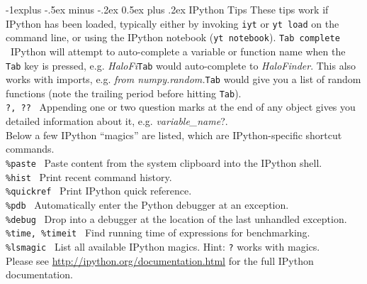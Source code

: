 \documentclass[10pt,landscape]{article}
\makeatletter
\renewcommand{\subsection}{\@startsection{subsection}{2}{0mm}%
                                {-1explus -.5ex minus -.2ex}%
                                {0.5ex plus .2ex}%
                                {\normalfont\normalsize\bfseries}}
\makeatother
\begin{document}
\begin{multicols}{3}
\subsection{IPython Tips}
These tips work if IPython has been loaded, typically either by invoking
\texttt{iyt} or \texttt{yt load} on the command line, or using the IPython notebook (\texttt{yt notebook}).
\texttt{Tab complete} \textemdash\ IPython will attempt to auto-complete a
variable or function name when the \texttt{Tab} key is pressed, e.g. {\it HaloFi}\textendash\texttt{Tab} would auto-complete
to {\it HaloFinder}. This also works with imports, e.g. {\it from numpy.random.}\textendash\texttt{Tab}
would give you a list of random functions (note the trailing period before hitting \texttt{Tab}).\\
\texttt{?, ??} \textemdash\ Appending one or two question marks at the end of any object gives you
detailed information about it, e.g. {\it variable\_name}?.\\
Below a few IPython ``magics'' are listed, which are IPython-specific shortcut commands.\\
\texttt{\%paste} \textemdash\ Paste content from the system clipboard into the IPython shell.\\
\texttt{\%hist} \textemdash\ Print recent command history.\\
\texttt{\%quickref} \textemdash\ Print IPython quick reference.\\
\texttt{\%pdb} \textemdash\ Automatically enter the Python debugger at an exception.\\
\texttt{\%debug} \textemdash\ Drop into a debugger at the location of the last unhandled exception. \\
\texttt{\%time, \%timeit} \textemdash\ Find running time of expressions for benchmarking.\\
\texttt{\%lsmagic} \textemdash\ List all available IPython magics. Hint: \texttt{?} works with magics.\\


Please see \url{http://ipython.org/documentation.html} for the full
IPython documentation.


\end{multicols}
\end{document}
